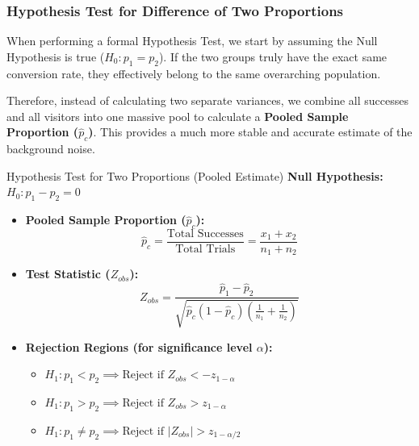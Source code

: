\subsubsection{Hypothesis Test for Difference of Two Proportions}

When performing a formal Hypothesis Test, we start by assuming the Null Hypothesis is true ($H_0: p_1 = p_2$). If the two groups truly have the exact same conversion rate, they effectively belong to the same overarching population. 

Therefore, instead of calculating two separate variances, we combine all successes and all visitors into one massive pool to calculate a \textbf{Pooled Sample Proportion ($\hat{p}_c$)}. This provides a much more stable and accurate estimate of the background noise.

\begin{defbox}{Hypothesis Test for Two Proportions (Pooled Estimate)}
\textbf{Null Hypothesis:} $H_0: p_1 - p_2 = 0$

\begin{itemize}
    \item \textbf{Pooled Sample Proportion ($\hat{p}_c$):}
    \begin{equation}
        \hat{p}_{c} = \frac{\text{Total Successes}}{\text{Total Trials}} = \frac{x_1 + x_2}{n_1 + n_2} 
    \end{equation}

    \item \textbf{Test Statistic ($Z_{obs}$):}
    \begin{equation}
        Z_{obs} = \frac{\hat{p}_{1}-\hat{p}_{2}}{\sqrt{\hat{p}_{c}(1-\hat{p}_{c})\left(\frac{1}{n_{1}}+\frac{1}{n_{2}}\right)}} 
    \end{equation} 

    \item \textbf{Rejection Regions (for significance level $\alpha$):}
    \begin{itemize}
        \item $H_1: p_1 < p_2 \implies \text{Reject if } Z_{obs} < -z_{1-\alpha}$
        \item $H_1: p_1 > p_2 \implies \text{Reject if } Z_{obs} > z_{1-\alpha}$
        \item $H_1: p_1 \neq p_2 \implies \text{Reject if } |Z_{obs}| > z_{1-\alpha/2}$
    \end{itemize}
\end{itemize}
\end{defbox}

